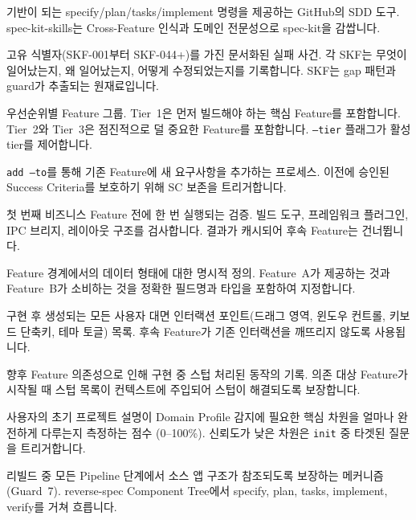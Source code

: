 \documentclass[11pt,a4paper,openright,twoside]{report}
\begin{document}
\begin{description}[style=nextline]
  \item[spec-kit] 기반이 되는 specify/plan/tasks/implement 명령을 제공하는 GitHub의 SDD 도구. spec-kit-skills는 Cross-Feature 인식과 도메인 전문성으로 spec-kit을 감쌉니다.

  \item[SKF (Skill Feedback)] 고유 식별자(SKF-001부터 SKF-044+)를 가진 문서화된 실패 사건. 각 SKF는 무엇이 일어났는지, 왜 일어났는지, 어떻게 수정되었는지를 기록합니다. SKF는 gap 패턴과 guard가 추출되는 원재료입니다.

  \item[Tier] 우선순위별 Feature 그룹. Tier~1은 먼저 빌드해야 하는 핵심 Feature를 포함합니다. Tier~2와 Tier~3은 점진적으로 덜 중요한 Feature를 포함합니다. \texttt{--tier} 플래그가 활성 tier를 제어합니다.

  \item[Augmentation] \texttt{add --to}를 통해 기존 Feature에 새 요구사항을 추가하는 프로세스. 이전에 승인된 Success Criteria를 보호하기 위해 SC 보존을 트리거합니다.

  \item[Foundation Gate] 첫 번째 비즈니스 Feature 전에 한 번 실행되는 검증. 빌드 도구, 프레임워크 플러그인, IPC 브리지, 레이아웃 구조를 검사합니다. 결과가 캐시되어 후속 Feature는 건너뜁니다.

  \item[Integration Contract] Feature 경계에서의 데이터 형태에 대한 명시적 정의. Feature~A가 제공하는 것과 Feature~B가 소비하는 것을 정확한 필드명과 타입을 포함하여 지정합니다.

  \item[Interaction Surface Inventory] 구현 후 생성되는 모든 사용자 대면 인터랙션 포인트(드래그 영역, 윈도우 컨트롤, 키보드 단축키, 테마 토글) 목록. 후속 Feature가 기존 인터랙션을 깨뜨리지 않도록 사용됩니다.

  \item[Stub Registry] 향후 Feature 의존성으로 인해 구현 중 스텁 처리된 동작의 기록. 의존 대상 Feature가 시작될 때 스텁 목록이 컨텍스트에 주입되어 스텁이 해결되도록 보장합니다.

  \item[Clarity Index] 사용자의 초기 프로젝트 설명이 Domain Profile 감지에 필요한 핵심 차원을 얼마나 완전하게 다루는지 측정하는 점수 (0--100\%). 신뢰도가 낮은 차원은 \texttt{init} 중 타겟된 질문을 트리거합니다.

  \item[Fidelity Chain] 리빌드 중 모든 Pipeline 단계에서 소스 앱 구조가 참조되도록 보장하는 메커니즘 (Guard~7). reverse-spec Component Tree에서 specify, plan, tasks, implement, verify를 거쳐 흐릅니다.


\end{description}
\end{document}
